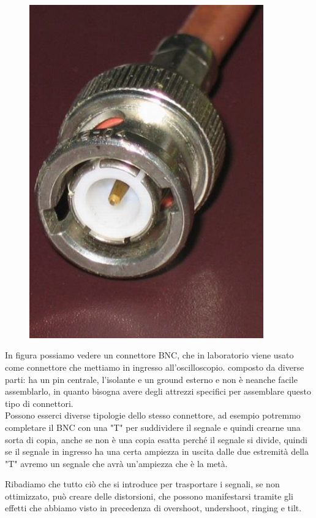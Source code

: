 \begin{esempio}
   \begin{minipage}{0.39\textwidth}
      \begin{figure}[H]
         \centering
         \includegraphics[width=0.9\textwidth]{immagini/connettore_BNC.png}
      \end{figure}
   \end{minipage}
   \begin{minipage}{0.6\textwidth}
      \vspace{0.6cm}In figura possiamo vedere un connettore BNC, che in laboratorio viene usato come connettore che mettiamo in ingresso all'oscilloscopio. \E composto da diverse parti: ha un pin centrale, l'isolante e un ground esterno e non è neanche facile assemblarlo, in quanto bisogna avere degli attrezzi specifici per assemblare questo tipo di connettori.\\
      Possono esserci diverse tipologie dello stesso connettore, ad esempio potremmo completare il BNC con una "T" per suddividere il segnale e quindi crearne una sorta di copia, anche se non è una copia esatta perché il segnale si divide, quindi se il segnale in ingresso ha una certa ampiezza in uscita dalle due estremità della "T" avremo un segnale che avrà un'ampiezza che è la metà.
   \end{minipage}
\end{esempio}
Ribadiamo che tutto ciò che si introduce per trasportare i segnali, se non ottimizzato, può creare delle distorsioni, che possono manifestarsi tramite gli effetti che abbiamo visto in precedenza di overshoot, undershoot, ringing e tilt.

